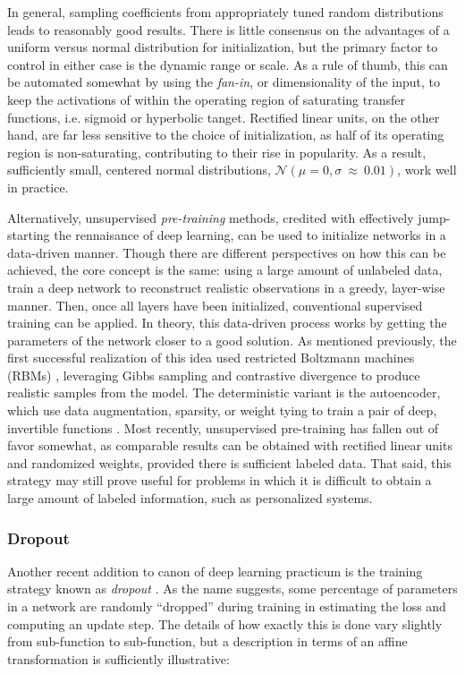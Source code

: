 In general, sampling coefficients from appropriately tuned random distributions leads to reasonably good results.
There is little consensus on the advantages of a uniform versus normal distribution for initialization, but the primary factor to control in either case is the dynamic range or scale.
As a rule of thumb, this can be automated somewhat by using the \emph{fan-in}, or dimensionality of the input, to keep the activations of within the operating region of saturating transfer functions, i.e. sigmoid or hyperbolic tanget.
Rectified linear units, on the other hand, are far less sensitive to the choice of initialization, as half of its operating region is non-saturating, contributing to their rise in popularity.
As a result, sufficiently small, centered normal distributions, $\mathcal{N}(\mu=0, \sigma~\approx~0.01)$, work well in practice.

Alternatively, unsupervised \emph{pre-training} methods, credited with effectively jump-starting the rennaisance of deep learning, can be used to initialize networks in a data-driven manner.
Though there are different perspectives on how this can be achieved, the core concept is the same:
using a large amount of unlabeled data, train a deep network to reconstruct realistic observations in a greedy, layer-wise manner.
Then, once all layers have been initialized, conventional supervised training can be applied.
In theory, this data-driven process works by getting the parameters of the network closer to a good solution.
As mentioned previously, the first successful realization of this idea used restricted Boltzmann machines (RBMs) \cite{Hinton2006Fast}, leveraging Gibbs sampling and contrastive divergence to produce realistic samples from the model.
The deterministic variant is the autoencoder, which use data augmentation, sparsity, or weight tying to train a pair of deep, invertible functions \cite{Bengio2013Representation}.
Most recently, unsupervised pre-training has fallen out of favor somewhat, as comparable results can be obtained with rectified linear units and randomized weights, provided there is sufficient labeled data.
That said, this strategy may still prove useful for problems in which it is difficult to obtain a large amount of labeled information, such as personalized systems.


\subsubsection{Dropout}

Another recent addition to canon of deep learning practicum is the training strategy known as \emph{dropout} \cite{Hinton2012Improving}.
As the name suggests, some percentage of parameters in a network are randomly ``dropped'' during training in estimating the loss and computing an update step.
The details of how exactly this is done vary slightly from sub-function to sub-function, but a description in terms of an affine transformation is sufficiently illustrative:

